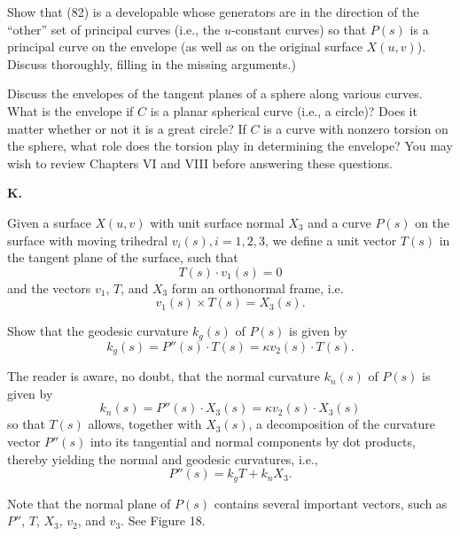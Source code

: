 \documentclass{book}
\begin{document}
Show that (82) is a developable whose generators are in the direction of the ``other'' set of principal curves (i.e., the $u$-constant curves) so that $P(s)$ is a principal curve on the envelope (as well as on the original surface $X(u,v)$). Discuss thoroughly, filling in the missing arguments.)

Discuss the envelopes of the tangent planes of a sphere along various curves. What is the envelope if $C$ is a planar spherical curve (i.e., a circle)? Does it matter whether or not it is a great circle? If $C$ is a curve with nonzero torsion on the sphere, what role does the torsion play in determining the envelope? You may wish to review Chapters VI and VIII before answering these questions.

\vspace{0.3cm}

\noindent \textbf{K.}

\vspace{0.3cm}

Given a surface $X(u,v)$ with unit surface normal $X_{3}$ and a curve $P(s)$ on the surface with moving trihedral $v_{i}(s), i = 1,2,3$, we define a unit vector $T(s)$ in the tangent plane of the surface, such that
\begin{equation}
T(s) \cdot v_{1}(s) = 0
\end{equation}
and the vectors $v_{1}$, $T$, and $X_{3}$ form an orthonormal frame, i.e.
\begin{equation}
v_{1}(s) \times T(s) = X_{3}(s).
\end{equation}

Show that the geodesic curvature $k_{g}(s)$ of $P(s)$ is given by
\begin{equation}
k_{g}(s) = P''(s) \cdot T(s) = \kappa v_{2}(s) \cdot T(s).
\end{equation}

The reader is aware, no doubt, that the normal curvature $k_{n}(s)$ of $P(s)$ is given by
\begin{equation}
k_{n}(s) = P''(s) \cdot X_{3}(s) = \kappa v_{2}(s) \cdot X_{3}(s)
\end{equation}
so that $T(s)$ allows, together with $X_{3}(s)$, a decomposition of the curvature vector $P''(s)$ into its tangential and normal components by dot products, thereby yielding the normal and geodesic curvatures, i.e.,
\begin{equation}
P''(s) = k_{g}T + k_{n} X_{3}.
\end{equation}

Note that the normal plane of $P(s)$ contains several important vectors, such as $P''$, $T$, $X_{3}$, $v_{2}$, and $v_{3}$. See Figure 18.
\end{document}
